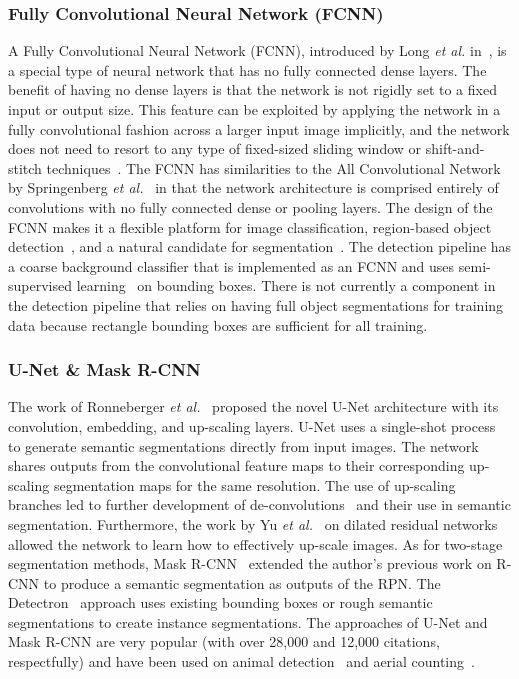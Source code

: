\subsubsection{Fully Convolutional Neural Network (FCNN)}

A Fully Convolutional Neural Network (FCNN), introduced by Long \textit{et al.} in~\cite{long_fully_2015}, is a special type of neural network that has no fully connected dense layers.  The benefit of having no dense layers is that the network is not rigidly set to a fixed input or output size.  This feature can be exploited by applying the network in a fully convolutional fashion across a larger input image implicitly, and the network does not need to resort to any type of fixed-sized sliding window or shift-and-stitch techniques~\cite{sermanet_overfeat:_2013,gouk_fast_2014}.  The FCNN has similarities to the All Convolutional Network by Springenberg \textit{et al.}~\cite{springenberg_striving_2014} in that the network architecture is comprised entirely of convolutions with no fully connected dense or pooling layers.  The design of the FCNN makes it a flexible platform for image classification, region-based object detection~\cite{dai_r-fcn_2016}, and a natural candidate for segmentation~\cite{singh_r-fcn-3000_2018}.  The detection pipeline has a coarse background classifier that is implemented as an FCNN and uses semi-supervised learning~\cite{zhu_introduction_2009} on bounding boxes.  There is not currently a component in the detection pipeline that relies on having full object segmentations for training data because rectangle bounding boxes are sufficient for all training.

\subsubsection{U-Net \& Mask R-CNN}

The work of Ronneberger \textit{et al.}~\cite{ronneberger_u-net:_2015} proposed the novel U-Net architecture with its convolution, embedding, and up-scaling layers.  U-Net uses a single-shot process to generate semantic segmentations directly from input images.  The network shares outputs from the convolutional feature maps to their corresponding up-scaling segmentation maps for the same resolution.  The use of up-scaling branches led to further development of de-convolutions~\cite{zeiler_deconvolutional_2010,fu_stacked_2019,cai_unified_2016} and their use in semantic segmentation.  Furthermore, the work by Yu \textit{et al.}~\cite{yu_dilated_2017} on dilated residual networks allowed the network to learn how to effectively up-scale images.  As for two-stage segmentation methods, Mask R-CNN~\cite{he_mask_2017} extended the author's previous work on R-CNN to produce a semantic segmentation as outputs of the RPN.  The Detectron~\cite{girshick_detectron_2018} approach uses existing bounding boxes or rough semantic segmentations to create instance segmentations.  The approaches of U-Net and Mask R-CNN are very popular (with over 28,000 and 12,000 citations, respectfully) and have been used on animal detection~\cite{brunger_panoptic_2020,rozsivalova_counting_2020,singh_animal_2020} and aerial counting~\cite{sarwar_detecting_2018,xu_automated_2020,barbedo_study_2019}.

